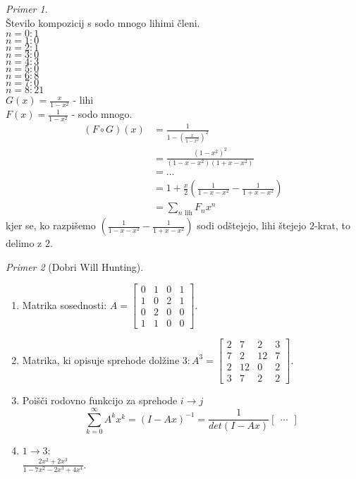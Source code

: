 \documentclass[a4paper, 12pt]{book}
\theoremstyle{definition}
\theoremstyle{remark}
\newtheorem*{ex}{Primer}
\begin{document}
\begin{ex} \text{} \\
  Število kompozicij s sodo mnogo lihimi členi. \\
  $n = 0: 1$ \\
  $n = 1: 0$ \\
  $n = 2: 1$ \\
  $n = 3: 0$ \\
  $n = 4: 3$ \\
  $n = 5: 0$ \\
  $n = 6: 8$ \\
  $n = 7: 0$ \\
  $n = 8: 21$ \\
  $G(x) = \frac{x}{1-x^2}$ - lihi \\
  $F(x) = \frac{1}{1-x^2}$ - sodo mnogo.
  \begin{align*}
    (F \circ G)(x) &= \frac{1}{1-\left(\frac{x}{1-x^2}\right)^2} \\
    &= \frac{(1-x^2)^2}{(1-x-x^2)(1+x-x^2)} \\
    &= \dots \\
    &= 1 + \frac{x}{2} \left(\frac{1}{1-x-x^2} - \frac{1}{1+x-x^2}\right) \\
    &= \sum_{n \text{ lih}} F_n x^n
  \end{align*}
  kjer se, ko razpišemo $\left(\frac{1}{1-x-x^2} - \frac{1}{1+x-x^2}\right)$ sodi odštejejo, lihi štejejo $2$-krat, to delimo z $2$.
\end{ex}



\begin{ex}[Dobri Will Hunting] \text{} \\
  \begin{enumerate}[label=(\arabic{*})]
    \item Matrika sosednosti: $A=\begin{bmatrix}
        0 & 1 & 0 & 1 \\
        1 & 0 & 2 & 1 \\
        0 & 2 & 0 & 0 \\
        1 & 1 & 0 & 0
      \end{bmatrix}$.
    \item Matrika, ki opisuje sprehode dolžine $3: A^3=\begin{bmatrix}
        2 & 7 & 2 & 3 \\
        7 & 2 & 12 & 7 \\
        2 & 12 & 0 & 2 \\
        3 & 7 & 2 & 2
      \end{bmatrix}$.
    \item Poišči rodovno funkcijo za sprehode $i \to j$
      \begin{equation*}
        \sum_{k=0}^{\infty} A^k x^k = (I-Ax)^{-1} = \frac{1}{det(I-Ax)} \begin{bmatrix}\dots\end{bmatrix}
      \end{equation*}
    \item $1 \to 3$: \\
      $\frac{2x^2 + 2x^3}{1 - 7x^2 - 2x^3 + 4x^4}$.
  \end{enumerate}
\end{ex}
\end{document}

